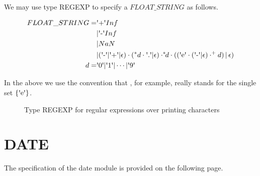 \documentclass[runningheads,12pt]{article}
\begin{document}
We may use type REGEXP to specify a $FLOAT\_STRING$ as follows.

\begin{align}
FLOAT\_STRING = &\squote{+}Inf\\
&|\squote{-}Inf\\
&|NaN\\
&|(\squote{-}|\squote{+}|\epsilon)\cdot(^*d\cdot\squote{.}|\epsilon)\cdot
	^*\!\!d\cdot ((\squote{e}\cdot(\squote{-}|\epsilon)\cdot^\textrm{+}d)\,|\,\epsilon)\\
d = &\squote{0} | \squote{1} | \cdots |\squote{9} 
\end{align}

In the above we use the convention that , for example, really stands for the single set $\{\squote{e}\}$.


\begin{figure} [H]

\caption{Type REGEXP for regular expressions over printing characters}
\end{figure}




\section{DATE}
The specification of the date module is provided on the following page.
\newpage

\centering 
    
\end{document}
